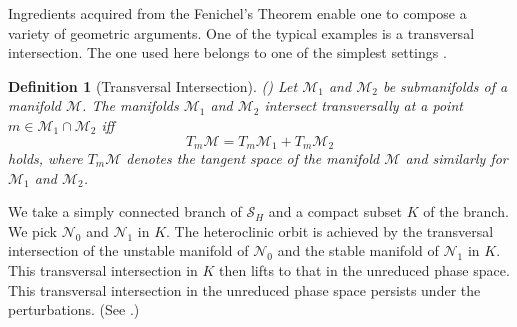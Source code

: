 \documentclass[usletter,11pt]{article}
\newtheorem{definition}{Definition}[section]
\theoremstyle{remark}
\begin{document}



Ingredients acquired from the Fenichel's Theorem enable one to compose a variety of geometric arguments. One of the typical examples is a transversal intersection. The one used here belongs to one of the simplest settings \cite[Theorem 3.1]{Sz1991}.
\begin{definition}[Transversal Intersection]  (\cite[Definition 3.1]{Sz1991})
 Let ${\mathcal{M}}_1$ and ${\mathcal{M}}_2$ be submanifolds of a manifold ${\mathcal{M}}$. The manifolds ${\mathcal{M}}_1$ and ${\mathcal{M}}_2$ intersect transversally at a point $m\in{\mathcal{M}}_1\cap {\mathcal{M}}_2$ iff 
 $$T_m{\mathcal{M}} =  T_m{\mathcal{M}}_1+T_m{\mathcal{M}}_2$$
 holds, where $T_m\mathcal{M}$ denotes the tangent space of the manifold $\mathcal{M}$ and similarly for $\mathcal{M}_1$ and $\mathcal{M}_2$.
\end{definition}

We take a simply connected branch of  $\mathcal{S}_H$ and a compact subset $K$ of the branch. We pick $\mathcal{N}_0$ and $\mathcal{N}_1$ in $K$. The heteroclinic orbit is achieved by the transversal intersection of the unstable manifold of $\mathcal{N}_0$ and the stable manifold of $\mathcal{N}_1$ in $K$. This transversal intersection in $K$ then lifts to that in the unreduced phase space. This transversal intersection in the unreduced phase space persists under the perturbations. (See \cite[Theorem 3.1]{Sz1991}.) %
\end{document}

